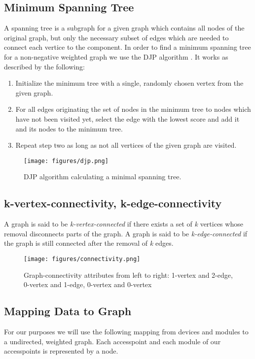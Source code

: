   \subsection{Minimum Spanning Tree}
    A spanning tree is a subgraph for a given graph which contains all nodes of the original graph, but only the necessary subset of edges which are needed to connect each vertice
    to the component. In order to find a minimum spanning tree for a non-negative weighted graph we use the DJP algorithm \cite{prim}\cite{jarnik}.
    It works as described by the following:
    \begin{enumerate}
     \item Initialize the minimum tree with a single, randomly chosen vertex from the given graph.
     \item For all edges originating the set of nodes in the minimum tree to nodes which have not been visited yet, select the edge with the lowest score and add it and its nodes 
      to the minimum tree.
     \item Repeat step two as long as not all vertices of the given graph are visited.
    \end{enumerate}
    \begin{figure}[th!]
      \centering
      \texttt{[image: figures/djp.png]}
      \caption{DJP algorithm calculating a minimal spanning tree.}
      \label{fig:djp}
    \end{figure}
    
  \subsection{k-vertex-connectivity, k-edge-connectivity}
    A graph is said to be \textit{k-vertex-connected} if there exists a set of \textit{k} vertices whose removal disconnects parts of the graph.\newline
    A graph is said to be \textit{k-edge-connected} if the graph is still connected after the removal of \textit{k} edges.
    \begin{figure}[th!]
      \centering
      \texttt{[image: figures/connectivity.png]}
      \caption{Graph-connectivity attributes from left to right: 1-vertex and 2-edge, 0-vertex and 1-edge, 0-vertex and 0-vertex}
      \label{fig:connectivity}
    \end{figure}
    
  \subsection{Mapping Data to Graph}
    For our purposes we will use the following mapping from devices and modules to a undirected, weighted graph.
    Each accesspoint and each module of our accesspoints is represented by a node.
    
